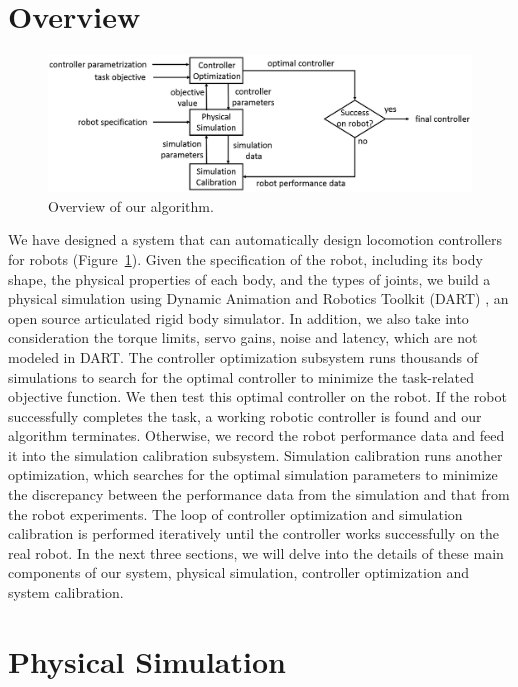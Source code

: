 \section{Overview}

\begin{figure}[!t]
  \centering
  \includegraphics[width=6in]{figures/controllerTransfer}
  \caption{Overview of our algorithm.}
  \label{fig:controllerTransferOverview}
\end{figure}

We have designed a system that can automatically design locomotion controllers for robots (Figure~\ref{fig:controllerTransferOverview}). Given the specification of the robot, including its body shape, the physical properties of each body, and the types of joints, we build a physical simulation using Dynamic Animation and Robotics Toolkit (DART) \cite{dart:2012}, an open source articulated rigid body simulator. In addition, we also take into consideration the torque limits, servo gains, noise and latency, which are not modeled in DART. The controller optimization subsystem runs thousands of simulations to search for the optimal controller to minimize the task-related objective function. We then test this optimal controller on the robot. If the robot successfully completes the task, a working robotic controller is found and our algorithm terminates. Otherwise, we record the robot performance data and feed it into the simulation calibration subsystem. Simulation calibration runs another optimization, which searches for the optimal simulation parameters to minimize the discrepancy between the performance data from the simulation and that from the robot experiments. The loop of controller optimization and simulation calibration is performed iteratively until the controller works successfully on the real robot. In the next three sections, we will delve into the details of these main components of our system, physical simulation, controller optimization and system calibration.

\section{Physical Simulation}

